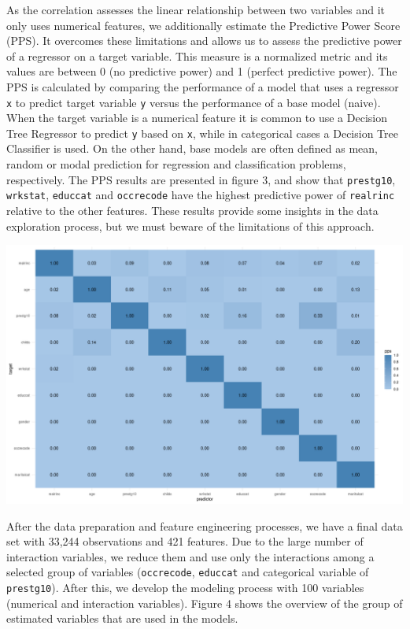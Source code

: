 \documentclass[11pt,a4paper]{article}
\let\origfigure\figure
\let\endorigfigure\endfigure
\renewenvironment{figure}[1][2] {
    \expandafter\origfigure\expandafter[H]
} {
    \endorigfigure
}
\begin{document}
As the correlation assesses the linear relationship between two
variables and it only uses numerical features, we additionally estimate
the Predictive Power Score (PPS). It overcomes these limitations and
allows us to assess the predictive power of a regressor on a target
variable. This measure is a normalized metric and its values are between
0 (no predictive power) and 1 (perfect predictive power). The PPS is
calculated by comparing the performance of a model that uses a regressor
\texttt{x} to predict target variable \texttt{y} versus the performance
of a base model (naive). When the target variable is a numerical feature
it is common to use a Decision Tree Regressor to predict \texttt{y}
based on \texttt{x}, while in categorical cases a Decision Tree
Classifier is used. On the other hand, base models are often defined as
mean, random or modal prediction for regression and classification
problems, respectively. The PPS results are presented in figure 3, and
show that \texttt{prestg10}, \texttt{wrkstat}, \texttt{educcat} and
\texttt{occrecode} have the highest predictive power of
\texttt{realrinc} relative to the other features. These results provide
some insights in the data exploration process, but we must beware of the
limitations of this approach.

\begin{figure}
\centering
\includegraphics{includes/pps.png}
\caption{PPS Results}
\end{figure}

After the data preparation and feature engineering processes, we have a
final data set with 33,244 observations and 421 features. Due to the
large number of interaction variables, we reduce them and use only the
interactions among a selected group of variables (\texttt{occrecode},
\texttt{educcat} and categorical variable of \texttt{prestg10}). After
this, we develop the modeling process with 100 variables (numerical and
interaction variables). Figure 4 shows the overview of the group of
estimated variables that are used in the models.
\end{document}
